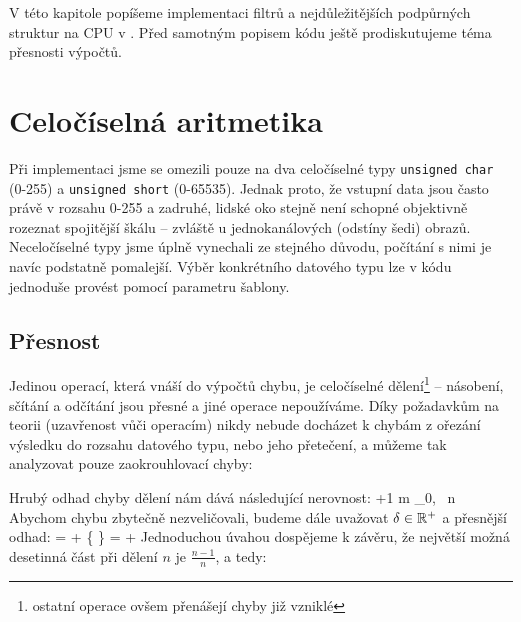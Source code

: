 

V této kapitole popíšeme implementaci filtrů a nejdůležitějších podpůrných struktur na CPU v \Cpp. Před samotným popisem kódu ještě prodiskutujeme téma přesnosti výpočtů.

    \section{Celočíselná aritmetika}

    Při implementaci jsme se omezili pouze na dva celočíselné typy {\tt unsigned char} (0-255) a {\tt unsigned short} (0-65535). Jednak proto, že vstupní data jsou často právě v rozsahu 0-255 a zadruhé, lidské oko stejně není schopné objektivně rozeznat spojitější škálu -- zvláště u jednokanálových (odstíny šedi) obrazů. Neceločíselné typy jsme úplně vynechali ze stejného důvodu, počítání s nimi je navíc podstatně pomalejší. Výběr konkrétního datového typu lze v kódu jednoduše provést pomocí parametru šablony.

        \subsection{Přesnost}

        Jedinou operací, která vnáší do výpočtů chybu, je celočíselné dělení\footnote{ostatní operace ovšem přenášejí chyby již vzniklé} -- násobení, sčítání a odčítání jsou přesné a jiné operace nepoužíváme. Díky požadavkům na teorii (uzavřenost vůči operacím) nikdy nebude docházet k chybám z ořezání výsledku do rozsahu datového typu, nebo jeho přetečení, a můžeme tak analyzovat pouze zaokrouhlovací chyby:

        Hrubý odhad chyby dělení nám dává následující nerovnost:
        \beq
         \le \Big\lfloor {} \Big\rfloor +1 \qquad m \in \Nn_0, \, n \in \Nn
        \eeq
        Abychom chybu zbytečně nezveličovali, budeme dále uvažovat $\delta \in \mathbb{R}^+$ a přesnější odhad:
        \beq
         = \Big\lfloor {} \Big\rfloor + \Big\{  \Big\} = \Big\lfloor {} \Big\rfloor + \delta
        \eeq
        Jednoduchou úvahou dospějeme k závěru, že největší možná desetinná část při dělení $n$ je $\frac{n-1}{n}$, a tedy:
        \beq
        \delta \leq {}
        \eeq


